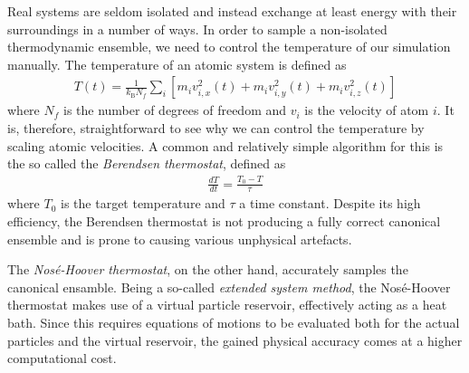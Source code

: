 Real systems are seldom isolated and instead exchange at least energy with their surroundings in a number of ways. 
In order to sample a non-isolated thermodynamic ensemble, we need to control the temperature of our simulation manually. 
The temperature of an atomic system is defined as
\begin{align}
T(t) = \frac{1}{k_{\text{B}}N_f}\sum_{i}\left[ m_iv_{i,x}^2(t) + m_iv_{i,y}^2(t) + m_iv_{i,z}^2(t)\right]
\end{align}
where $N_f$ is the number of degrees of freedom and $v_{i}$ is the velocity of atom $i$. 
It is, therefore, straightforward to see why we can control the temperature by scaling atomic velocities.
A common and relatively simple algorithm for this is the so called the \textit{Berendsen thermostat}, defined as
\begin{align}
\frac{dT}{dt} = \frac{T_0-T}{\tau}
\end{align}
where $T_0$ is the target temperature and $\tau$ a time constant. 
Despite its high efficiency, the Berendsen thermostat is not producing a fully correct canonical ensemble and is prone to causing various unphysical artefacts. \cite{berendsen1984molecular}

The \textit{Nos\'{e}-Hoover thermostat}, on the other hand, accurately samples the canonical ensamble. 
Being a so-called \textit{extended system method}, the Nos\'{e}-Hoover thermostat makes use of a virtual particle reservoir, effectively acting as a heat bath. 
Since this requires equations of motions to be evaluated both for the actual particles and the virtual reservoir, the gained physical accuracy comes at a higher computational cost. \cite{nose1984unified}

